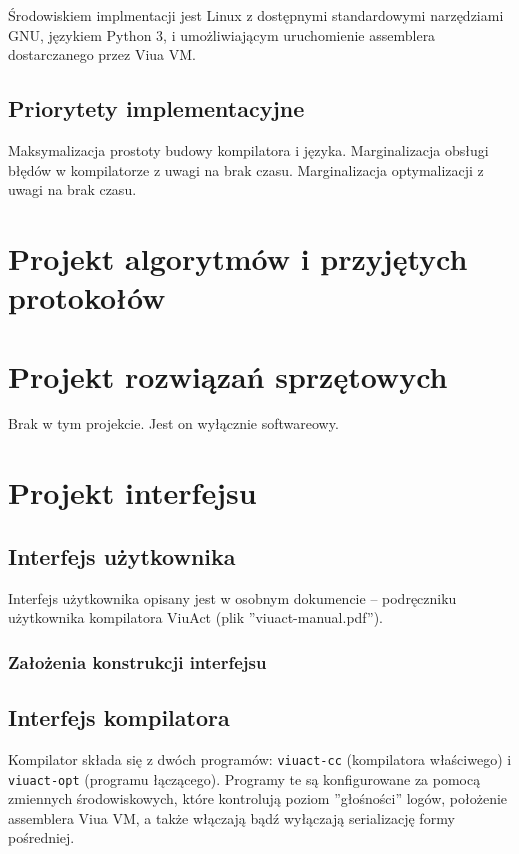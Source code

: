 \documentclass[11pt,oneside,a4paper,titlepage,onecolumn]{article}
\begin{document}
Środowiskiem implmentacji jest Linux z dostępnymi standardowymi narzędziami GNU, językiem Python 3, i
umożliwiającym uruchomienie assemblera dostarczanego przez Viua VM.

\subsection{Priorytety implementacyjne}

Maksymalizacja prostoty budowy kompilatora i języka.
Marginalizacja obsługi błędów w kompilatorze z uwagi na brak czasu.
Marginalizacja optymalizacji z uwagi na brak czasu.

\section{Projekt algorytmów i przyjętych protokołów}

\section{Projekt rozwiązań sprzętowych}

Brak w tym projekcie. Jest on wyłącznie softwareowy.

\section{Projekt interfejsu}

\subsection{Interfejs użytkownika}

Interfejs użytkownika opisany jest w osobnym dokumencie -- podręczniku użytkownika kompilatora ViuAct (plik
''viuact-manual.pdf'').

\subsubsection{Założenia konstrukcji interfejsu}

\subsection{Interfejs kompilatora}

Kompilator składa się z dwóch programów: \texttt{viuact-cc} (kompilatora właściwego) i \texttt{viuact-opt}
(programu łączącego). Programy te są konfigurowane za pomocą zmiennych środowiskowych, które kontrolują poziom
''głośności'' logów, położenie assemblera Viua VM, a także włączają bądź wyłączają serializację formy
pośredniej.
\end{document}
